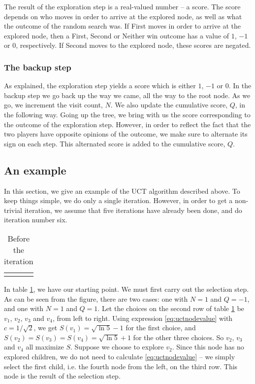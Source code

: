 The result of the exploration step is a real-valued number -- a score.
The score depends on who moves in order to arrive at the explored node, as well as what the outcome of the random search was.
If First moves in order to arrive at the explored node, then a First, Second or Neither win outcome has a value of $1$, $-1$ or $0$, respectively. If Second moves to the explored node, these scores are negated.

\subsubsection{The backup step}
\label{sec:backup_step_explanation}

As explained, the exploration step yields a score which is either $1$, $-1$ or $0$.
In the backup step we go back up the way we came, all the way to the root node.
As we go, we increment the visit count, $N$.
We also update the cumulative score, $Q$, in the following way.
Going up the tree, we bring with us the score corresponding to the outcome of the exploration step.
However, in order to reflect the fact that the two players have opposite opinions of the outcome, we make sure to alternate its sign on each step. This alternated score is added to the cumulative score, $Q$.

\subsection{An example}
In this section, we give an example of the UCT algorithm described above.
To keep things simple, we do only a single iteration.
However, in order to get a non-trivial iteration, we assume that five iterations have already been done, and do iteration number six.
\begin{center}
\def\arraystretch{5.5}
\begin{table}
\begin{tabular}{l}
  \def\svgwidth{\columnwidth} 
\end{tabular}
\caption{Before the iteration}
\label{tab:mcts_iteration_before}
\end{table}
\end{center}
In table \ref{tab:mcts_iteration_before}, we have our starting point.
We must first carry out the selection step. As can be seen from the figure, there are two cases: one with $N=1$ and $Q=-1$, and one with $N=1$ and $Q=1$.
Let the choices on the second row of table \ref{tab:mcts_iteration_before} be $v_1$, $v_2$, $v_3$ and $v_4$, from left to right.
Using expression \ref{eq:uctnodevalue} with $c = 1/\sqrt{2}$, we get $S(v_1) = \sqrt{\ln{5}} - 1$ for the first choice, and $S(v_2) = S(v_3) = S(v_4) = \sqrt{\ln{5}} + 1$ for the other three choices.
So $v_2$, $v_3$ and $v_4$ all maximize $S$.
Suppose we choose to explore $v_2$. Since this node has no explored children, we do not need to calculate \ref{eq:uctnodevalue} -- we simply select the first child, i.e. the fourth node from the left, on the third row.
This node is the result of the selection step.

